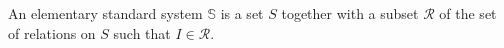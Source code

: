An elementary standard system $\mathbb{S}$ is a set $S$ together with a subset $\mathcal{R}$ of the set of relations on $S$ such that $I \in \mathcal{R}$.
